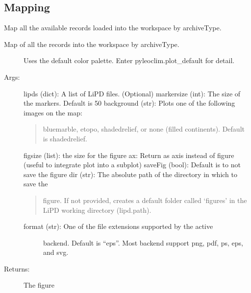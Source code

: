 \documentclass[letterpaper,10pt,english]{sphinxmanual}
\begin{document}
\subsection{Mapping}
\label{\detokenize{Main:mapping}}

\begin{fulllineitems}
\label{\detokenize{Main:pyleoclim.mapAllArchive}}
Map all the available records loaded into the workspace by archiveType.
\begin{description}
\item[{Map of all the records into the workspace by archiveType.}] \leavevmode
Uses the default color palette. Enter pyleoclim.plot\_default for detail.

\item[{Args:}] \leavevmode
lipds (dict): A list of LiPD files. (Optional)
markersize (int): The size of the markers. Default is 50
background (str): Plots one of the following images on the map:
\begin{quote}

bluemarble, etopo, shadedrelief, or none (filled continents).
Default is shadedrelief.
\end{quote}

figsize (list): the size for the figure
ax: Return as axis instead of figure (useful to integrate plot into a subplot)
saveFig (bool): Default is to not save the figure
dir (str): The absolute path of the directory in which to save the
\begin{quote}

figure. If not provided, creates a default folder called ‘figures’
in the LiPD working directory (lipd.path).
\end{quote}
\begin{description}
\item[{format (str): One of the file extensions supported by the active}] \leavevmode
backend. Default is “eps”. Most backend support png, pdf, ps, eps,
and svg.

\end{description}

\item[{Returns:}] \leavevmode
The figure

\end{description}

\end{fulllineitems}
\end{document}
